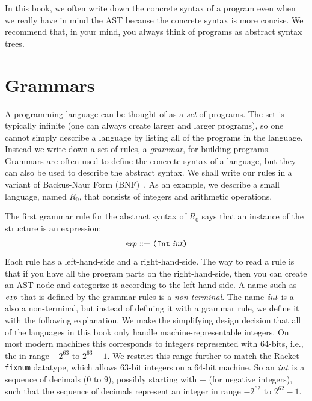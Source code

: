 \documentclass[11pt]{book}
\begin{document}
In this book, we often write down the concrete syntax of a program
even when we really have in mind the AST because the concrete syntax
is more concise.  We recommend that, in your mind, you always think of
programs as abstract syntax trees.

\section{Grammars}
\label{sec:grammar}

A programming language can be thought of as a \emph{set} of programs.
The set is typically infinite (one can always create larger and larger
programs), so one cannot simply describe a language by listing all of
the programs in the language. Instead we write down a set of rules, a
\emph{grammar}, for building programs. Grammars are often used to
define the concrete syntax of a language, but they can also be used to
describe the abstract syntax. We shall write our rules in a variant of
Backus-Naur Form (BNF)~\citep{Backus:1960aa,Knuth:1964aa}.
As an example, we describe a small language, named $R_0$, that consists of
integers and arithmetic operations.

The first grammar rule for the abstract syntax of $R_0$ says that an
instance of the  structure is an expression:
\begin{equation}
\mathit{exp} ::= \texttt{(Int}\;\mathit{int}\texttt{)}  \label{eq:arith-int}
\end{equation}
%
Each rule has a left-hand-side and a right-hand-side. The way to read
a rule is that if you have all the program parts on the
right-hand-side, then you can create an AST node and categorize it
according to the left-hand-side.
%
A name such as $\mathit{exp}$ that is
defined by the grammar rules is a \emph{non-terminal}.
%
The name $\mathit{int}$ is a also a non-terminal, but instead of defining it
with a grammar rule, we define it with the following explanation.  We
make the simplifying design decision that all of the languages in this
book only handle machine-representable integers.  On most modern
machines this corresponds to integers represented with 64-bits, i.e.,
the in range $-2^{63}$ to $2^{63}-1$.  We restrict this range further
to match the Racket \texttt{fixnum} datatype, which allows 63-bit
integers on a 64-bit machine. So an $\mathit{int}$ is a sequence of decimals
($0$ to $9$), possibly starting with $-$ (for negative integers), such
that the sequence of decimals represent an integer in range $-2^{62}$
to $2^{62}-1$.
\end{document}
